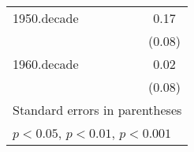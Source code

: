 {\begin{tabular}{l*{5}{c}}
\addlinespace
1950.decade&                  &                  &                  &                  &     0.17\sym{*}  \\
          &                  &                  &                  &                  &   (0.08)         \\
\addlinespace
1960.decade&                  &                  &                  &                  &     0.02         \\
          &                  &                  &                  &                  &   (0.08)         \\
\bottomrule
\multicolumn{6}{l}{\footnotesize Standard errors in parentheses}\\
\multicolumn{6}{l}{\footnotesize \sym{*} \(p<0.05\), \sym{**} \(p<0.01\), \sym{***} \(p<0.001\)}\\
\end{tabular}
}
